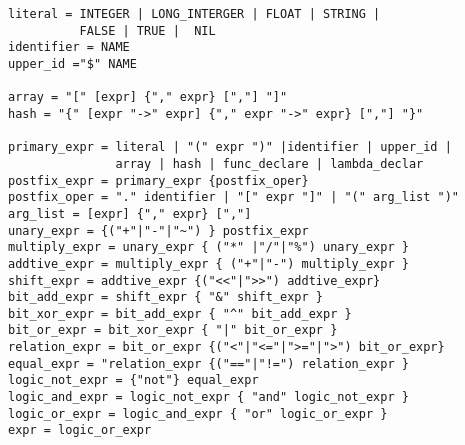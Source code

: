 \begin{verbatim}
literal = INTEGER | LONG_INTERGER | FLOAT | STRING | 
          FALSE | TRUE |  NIL 
identifier = NAME 
upper_id ="$" NAME 

array = "[" [expr] {"," expr} [","] "]"
hash = "{" [expr "->" expr] {"," expr "->" expr} [","] "}"

primary_expr = literal | "(" expr ")" |identifier | upper_id | 
               array | hash | func_declare | lambda_declar 
postfix_expr = primary_expr {postfix_oper}
postfix_oper = "." identifier | "[" expr "]" | "(" arg_list ")"
arg_list = [expr] {"," expr} [","]
unary_expr = {("+"|"-"|"~") } postfix_expr 
multiply_expr = unary_expr { ("*" |"/"|"%") unary_expr }
addtive_expr = multiply_expr { ("+"|"-") multiply_expr }
shift_expr = addtive_expr {("<<"|">>") addtive_expr} 
bit_add_expr = shift_expr { "&" shift_expr }
bit_xor_expr = bit_add_expr { "^" bit_add_expr }
bit_or_expr = bit_xor_expr { "|" bit_or_expr }
relation_expr = bit_or_expr {("<"|"<="|">="|">") bit_or_expr}
equal_expr = "relation_expr {("=="|"!=") relation_expr }
logic_not_expr = {"not"} equal_expr 
logic_and_expr = logic_not_expr { "and" logic_not_expr }
logic_or_expr = logic_and_expr { "or" logic_or_expr }
expr = logic_or_expr
\end{verbatim}
